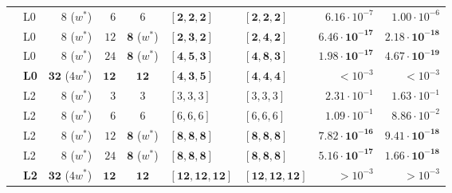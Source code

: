 \begin{table}[!htbp]
{\begin{tabular}{@{}llrrcllrr@{}}
 & L0 & $8$ ($w^*$) & $6$ & $6$ & $\mathbf{[2, 2, 2]}$ & $\mathbf{[2, 2, 2]}$ & $6.16\cdot 10^{-7}$ & $1.00\cdot 10^{-6}$ \\
 & L0 & $8$ ($w^*$) & $12$ & $\mathbf{8}$ ($w^*$) & $\mathbf{[2, 3, 2]}$ & $\mathbf{[2, 4, 2]}$ & $\mathbf{6.46\cdot 10^{-17}}$ & $\mathbf{2.18\cdot 10^{-18}}$ \\
 & L0 & $8$ ($w^*$) & $24$ & $\mathbf{8}$ ($w^*$) & $\mathbf{[4, 5, 3]}$ & $\mathbf{[4, 8, 3]}$ & $\mathbf{1.98\cdot 10^{-17}}$ & $\mathbf{4.67\cdot 10^{-19}}$ \\
 & \textbf{L0} & $\mathbf{32}$ ($4w^*$) & $\mathbf{12}$ & $\mathbf{12}$ & $\mathbf{[4, 3, 5]}$ & $\mathbf{[4, 4, 4]}$ & $< 10^{-3}$ & $< 10^{-3}$ \\
 & L2 & $8$ ($w^*$) & $3$ & $3$ & $[3, 3, 3]$ & $[3, 3, 3]$ & $2.31\cdot 10^{-1}$ & $1.63\cdot 10^{-1}$ \\
 & L2 & $8$ ($w^*$) & $6$ & $6$ & $[6, 6, 6]$ & $[6, 6, 6]$ & $1.09\cdot 10^{-1}$ & $8.86\cdot 10^{-2}$ \\
 & L2 & $8$ ($w^*$) & $12$ & $\mathbf{8}$ ($w^*$) & $\mathbf{[8, 8, 8]}$ & $\mathbf{[8, 8, 8]}$ & $\mathbf{7.82\cdot 10^{-16}}$ & $\mathbf{9.41\cdot 10^{-18}}$ \\
 & L2 & $8$ ($w^*$) & $24$ & $\mathbf{8}$ ($w^*$) & $\mathbf{[8, 8, 8]}$ & $\mathbf{[8, 8, 8]}$ & $\mathbf{5.16\cdot 10^{-17}}$ & $\mathbf{1.66\cdot 10^{-18}}$ \\
 & \textbf{L2} & $\mathbf{32}$ ($4w^*$) & $\mathbf{12}$ & $\mathbf{12}$ & $\mathbf{[12, 12, 12]}$ & $\mathbf{[12, 12, 12]}$ & $> 10^{-3}$ & $> 10^{-3}$ \\
\bottomrule
\end{tabular}
}
\end{table}

